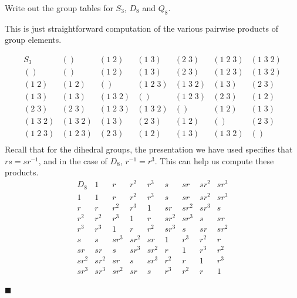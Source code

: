 \documentclass[12pt]{article}
\renewcommand{\qed}{\hfill$\blacksquare$}
\renewenvironment{proof}{\begin{addmargin}[1em]{0em}\begin{newproof}}{\end{newproof}\end{addmargin}\qed}
\newenvironment{problem}[2][Exercise]{\begin{trivlist}
\item[\hskip \labelsep {\bfseries #1}\hskip \labelsep {\bfseries #2.}]}{\end{trivlist}}
\begin{document}
\begin{problem}{1.5.2}
Write out the group tables for $S_3$, $D_8$ and $Q_8$.
\end{problem}

\begin{proof}
This is just straightforward computation of the various pairwise products of group elements.

\begin{equation*}
    \begin{array}{c|cccccc}
    S_3 & \left(\right) & \left(1\;2\right) & \left(1\;3\right) & \left(2\;3\right) & \left(1\;2\;3\right) & \left(1\;3\;2\right) \\ \hline
    \left(\right) & \left(\right) & \left(1\;2\right) & \left(1\;3\right) & \left(2\;3\right) &\left(1\;2\;3\right) & \left(1\;3\;2\right) \\
    \left(1\;2\right)& \left(1\;2\right) & \left(\right) & \left(1\;2\;3\right) & \left(1\;3\;2\right) & \left(1\;3\right) & \left(2\;3\right) \\
    \left(1\;3\right) & \left(1\;3\right) & \left(1\;3\;2\right) & \left(\right) & \left(1\;2\;3\right) & \left(2\;3\right) & \left(1\;2\right) \\
    \left(2\;3\right) & \left(2\;3\right) & \left(1\;2\;3\right) & \left(1\;3\;2\right) & \left(\right) & \left(1\;2\right) & \left(1\;3\right)\\
    \left(1\;3\;2\right) & \left(1\;3\;2\right) & \left(1\;3\right) & \left(2\;3\right) & \left(1\;2\right) & \left(\right) & \left(2\;3\right) \\
    \left(1\;2\;3\right) & \left(1\;2\;3\right) & \left(2\;3\right) & \left(1\;2\right) & \left(1\;3\right) & \left(1\;3\;2\right) & \left(\right) \\
    \end{array}
\end{equation*}
Recall that for the dihedral groups, the presentation we have used specifies that $rs = sr^{-1}$, and in the case of $D_8$, $r^{-1}=r^3$. This can help us compute these products.
\begin{equation*}
    \begin{array}{c|cccccccc}
    D_8  & 1    & r    & r^2  & r^3  & s    & sr   & sr^2 & sr^3 \\ \hline
    1    & 1    & r    & r^2  & r^3  & s    & sr   & sr^2 & sr^3 \\
    r    & r    & r^2  & r^3  & 1    & sr   & sr^2 & sr^3 & s    \\
    r^2  & r^2  & r^3  & 1    & r    & sr^2 & sr^3 & s    & sr   \\
    r^3  & r^3  & 1    & r    & r^2  & sr^3 & s    & sr   & sr^2 \\
    s    & s    & sr^3 & sr^2 & sr   & 1    & r^3  & r^2  & r \\
    sr   & sr   & s    & sr^3 & sr^2 & r    & 1    & r^3  & r^2 \\
    sr^2 & sr^2 & sr   & s    & sr^3 & r^2  & r    & 1    & r^3 \\
    sr^3 & sr^3 & sr^2 & sr   & s    & r^3  & r^2  & r    & 1 \\
    \end{array}
\end{equation*}



\end{proof}
\end{document}
